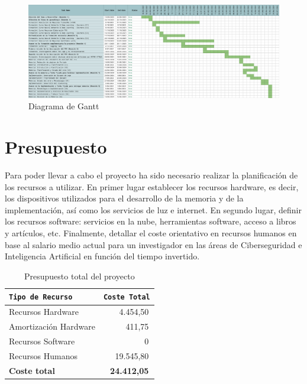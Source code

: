 \newpage

\begin{landscape}   
    \noindent\hspace*{-3.1cm}
    \begin{minipage}{\linewidth}
        \begin{figure}[H]
            \centering
            \includegraphics[width=1.3\linewidth, keepaspectratio]{imagenes/Diagrama de Gantt.png}
            \caption{Diagrama de Gantt}
            \label{fig:diagrama-gantt}
        \end{figure}
    \end{minipage}
\end{landscape}

\newpage


\section{Presupuesto}

Para poder llevar a cabo el proyecto ha sido necesario realizar la planificación de los recursos a utilizar. En primer lugar establecer los recursos hardware, es decir, los dispositivos utilizados para el desarrollo de la memoria y de la implementación, así como los servicios de luz e internet. En segundo lugar, definir los recursos software: servicios en la nube, herramientas software, acceso a libros y artículos, etc. Finalmente, detallar el coste orientativo en recursos humanos en base al salario medio actual para un investigador en las áreas de Ciberseguridad e Inteligencia Artificial en función del tiempo invertido.

\begin{table}[H]
    \centering
    \footnotesize
    \begin{tabularx}{\linewidth}{|>{\raggedright\arraybackslash}X|r|}
    \hline
    \rowcolor{graylight}\texttt{Tipo de Recurso} & \texttt{Coste Total} \\
    \hline
    Recursos Hardware & 4.454,50\,\text{\euro} \\
    \hline
    Amortización Hardware & 411,75\,\text{\euro} \\
    \hline
    Recursos Software & 0\,\text{\euro} \\
    \hline
    Recursos Humanos & 19.545,80\,\text{\euro} \\
    \hline
    \textbf{Coste total} & \textbf{24.412,05\,\text{\euro}} \\ %
    \hline
    \end{tabularx}
    \caption{Presupuesto total del proyecto}
    \label{tab:presupuesto_total}
\end{table}


